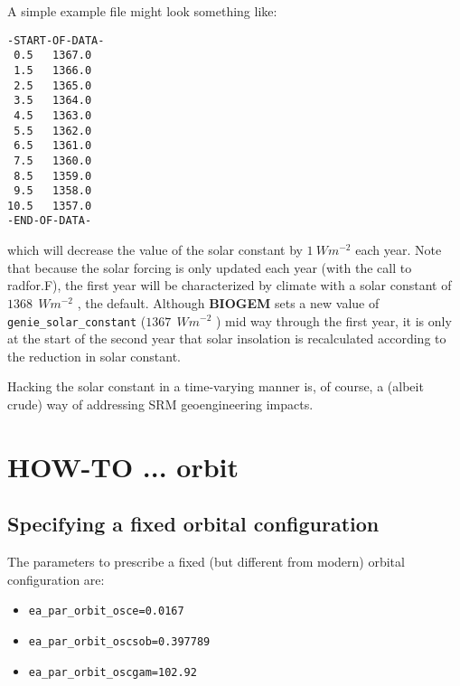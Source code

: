 A simple example file might look something like:
\vspace{-2mm}\small\begin{verbatim}
-START-OF-DATA-
 0.5   1367.0
 1.5   1366.0
 2.5   1365.0
 3.5   1364.0
 4.5   1363.0
 5.5   1362.0
 6.5   1361.0
 7.5   1360.0
 8.5   1359.0
 9.5   1358.0
10.5   1357.0
-END-OF-DATA-
\end{verbatim}\normalsize\vspace{-2mm}
which will decrease the value of the solar constant by \(1 \:W m^{-2}\) each year. Note that because the solar forcing is only updated each year (with the call to \textsf{\footnotesize radfor.F}), the first year will be characterized by climate with a solar constant of \(1368\:\ W m^{-2}\) , the default. Although \textbf{BIOGEM} sets a new value of \texttt{genie\_solar\_constant} (\(1367\:\ W m^{-2}\) ) mid way through the first year, it is only at the start of the second year that solar insolation is recalculated according to the reduction in solar constant.

Hacking the solar constant in a time-varying manner is, of course, a (albeit crude) way of addressing SRM geoengineering impacts.


\newpage


\section{HOW-TO ... orbit}
\vspace{2mm}

%
\subsection*{Specifying a fixed orbital configuration}
\vspace{1mm}

The parameters to prescribe a fixed (but different from modern) orbital configuration are:

\vspace{1mm}
\begin{itemize}[noitemsep]
\setlength{\itemindent}{.2in}
\item \small\begin{verbatim}
ea_par_orbit_osce=0.0167
\end{verbatim}\normalsize
\item \small\begin{verbatim}
ea_par_orbit_oscsob=0.397789
\end{verbatim}\normalsize
\item \small\begin{verbatim}
ea_par_orbit_oscgam=102.92
\end{verbatim}\normalsize
\end{itemize}
\vspace{1mm}

